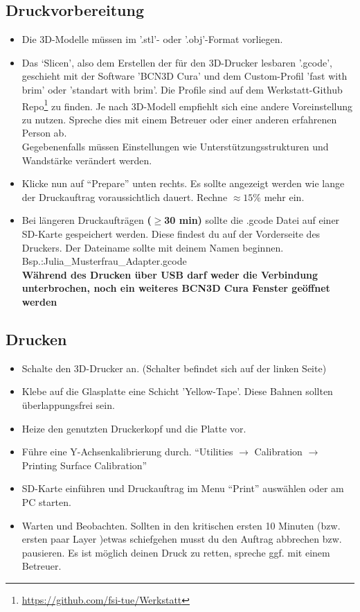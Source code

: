 \documentclass[a4paper]{article}
\begin{document}
\subsection{Druckvorbereitung}
\begin{itemize}
	\item Die 3D-Modelle müssen im '.stl'- oder '.obj'-Format vorliegen.
	\item Das ‘Slicen’, also dem Erstellen der für den 3D-Drucker lesbaren '.gcode', geschieht mit der Software 'BCN3D Cura' und dem Custom-Profil 'fast with brim' oder 'standart with brim'. Die Profile sind auf dem Werkstatt-Github Repo\footnote{\url{https://github.com/fsi-tue/Werkstatt}} zu finden.
	Je nach 3D-Modell empfiehlt sich eine andere Voreinstellung zu nutzen. Spreche dies mit einem Betreuer oder einer anderen erfahrenen Person ab.\\
	Gegebenenfalls müssen Einstellungen wie Unterstützungsstrukturen und Wandstärke verändert werden.
	\item Klicke nun auf "`Prepare"' unten rechts. Es sollte angezeigt werden wie lange der Druckauftrag voraussichtlich dauert. Rechne $\approx 15\%$ mehr ein.
	\item Bei längeren Druckaufträgen \textbf{($\geq$30 min)} sollte die .gcode Datei auf einer SD-Karte gespeichert werden. Diese findest du auf der Vorderseite des Druckers. Der Dateiname sollte mit deinem Namen beginnen. Bsp.:Julia\_Musterfrau\_Adapter.gcode\\
	\textbf{Während des Drucken über USB darf weder die Verbindung unterbrochen, noch ein weiteres BCN3D Cura Fenster geöffnet werden}
\end{itemize}
\subsection{Drucken}
\begin{itemize}
	\item Schalte den 3D-Drucker an. (Schalter befindet sich auf der linken Seite)
	\item Klebe auf die Glasplatte eine Schicht 'Yellow-Tape'. Diese Bahnen sollten überlappungsfrei sein.
	\item Heize den genutzten Druckerkopf und die Platte vor.
	\item Führe eine Y-Achsenkalibrierung durch. "`Utilities  $\rightarrow$ Calibration $\rightarrow $Printing Surface Calibration"'
	\item SD-Karte einführen und Druckauftrag im Menu "`Print"' auswählen oder am PC starten.
	\item Warten und Beobachten. Sollten in den kritischen ersten 10 Minuten (bzw. ersten paar Layer )etwas schiefgehen musst du den Auftrag abbrechen bzw. pausieren. Es ist möglich deinen Druck zu retten, spreche ggf. mit einem Betreuer.
\end{itemize}
\end{document}
